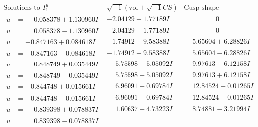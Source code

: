 \documentclass[1p]{elsarticle_modified}
\theoremstyle{definition}
\newcommand{\I}{\sqrt{-1}}
\begin{document}
$$\begin{array}{c|c|c}  
\text{Solutions to }I^u_{1}& \I (\text{vol} + \sqrt{-1}CS) & \text{Cusp shape}\\
 \hline 
\begin{aligned}
u &= \phantom{-}0.058378 + 1.130960 I\end{aligned}
 & -2.04129 + 1.77189 I & \phantom{-0.000000 } 0 \\ \hline\begin{aligned}
u &= \phantom{-}0.058378 - 1.130960 I\end{aligned}
 & -2.04129 - 1.77189 I & \phantom{-0.000000 } 0 \\ \hline\begin{aligned}
u &= -0.847163 + 0.084618 I\end{aligned}
 & -1.74912 - 9.58388 I & \phantom{-}5.65604 + 6.28826 I \\ \hline\begin{aligned}
u &= -0.847163 - 0.084618 I\end{aligned}
 & -1.74912 + 9.58388 I & \phantom{-}5.65604 - 6.28826 I \\ \hline\begin{aligned}
u &= \phantom{-}0.848749 + 0.035449 I\end{aligned}
 & \phantom{-}5.75598 + 5.05092 I & \phantom{-}9.97613 - 6.12158 I \\ \hline\begin{aligned}
u &= \phantom{-}0.848749 - 0.035449 I\end{aligned}
 & \phantom{-}5.75598 - 5.05092 I & \phantom{-}9.97613 + 6.12158 I \\ \hline\begin{aligned}
u &= -0.844748 + 0.015661 I\end{aligned}
 & \phantom{-}6.96091 - 0.69784 I & \phantom{-}12.84524 - 0.01265 I \\ \hline\begin{aligned}
u &= -0.844748 - 0.015661 I\end{aligned}
 & \phantom{-}6.96091 + 0.69784 I & \phantom{-}12.84524 + 0.01265 I \\ \hline\begin{aligned}
u &= \phantom{-}0.839398 + 0.078837 I\end{aligned}
 & \phantom{-}1.60637 + 4.73223 I & \phantom{-}8.74881 - 3.21994 I \\ \hline\begin{aligned}
u &= \phantom{-}0.839398 - 0.078837 I\end{aligned}

\end{array}$$
\end{document}
